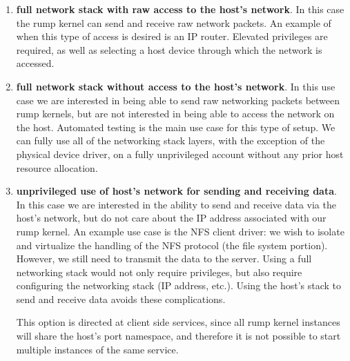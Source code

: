 \begin{enumerate}
\item   \textbf{full network stack with raw access to the host's
	network}.  In this case the rump kernel can send and receive
	raw network packets.  An example of when this type of access
	is desired is an IP router.  Elevated privileges are
	required, as well as selecting a host device through which
	the network is accessed.

\item   \textbf{full network stack without access to the host's
	network}.  In this use case we are interested in being able
	to send raw networking packets between rump kernels, but
	are not interested in being able to access the network on
	the host.  Automated testing is the main use case for this
	type of setup.  We can fully use all of the networking
	stack layers, with the exception of the physical device
	driver, on a fully unprivileged account without any prior
	host resource allocation.

\item   \textbf{unprivileged use of host's network for sending and
	receiving data}.  In this case we are interested in the
	ability to send and receive data via the host's network,
	but do not care about the IP address associated with our
	rump kernel.  An example use case is the NFS client driver:
	we wish to isolate and virtualize the handling of the NFS
	protocol (\ie the file system portion).  However, we still
	need to transmit the data to the server.  Using a full
	networking stack would not only require privileges, but
	also require configuring the networking stack (IP address,
	etc.).  Using the host's stack to send and receive data
	avoids these complications.

	This option is directed at client side services, since all
	rump kernel instances will share the host's port namespace,
	and therefore it is not possible to start multiple instances
	of the same service.
\end{enumerate}

